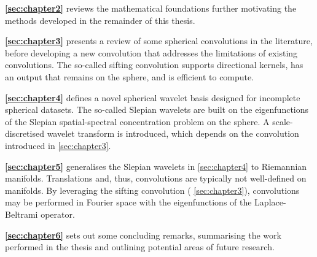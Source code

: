\begin{hangparas}{24pt}{1}
    \textbf{\cref{sec:chapter2}} reviews the mathematical foundations further motivating the methods developed in the remainder of this thesis.

    \textbf{\cref{sec:chapter3}} presents a review of some spherical convolutions in the literature, before developing a new convolution that addresses the limitations of existing convolutions.
    The so-called sifting convolution supports directional kernels, has an output that remains on the sphere, and is efficient to compute.

    \textbf{\cref{sec:chapter4}} defines a novel spherical wavelet basis designed for incomplete spherical datasets.
    The so-called Slepian wavelets are built on the eigenfunctions of the Slepian spatial-spectral concentration problem on the sphere.
    A scale-discretised wavelet transform is introduced, which depends on the convolution introduced in \cref{sec:chapter3}.

    \textbf{\cref{sec:chapter5}} generalises the Slepian wavelets in \cref{sec:chapter4} to Riemannian manifolds.
    Translations and, thus, convolutions are typically not well-defined on manifolds.
    By leveraging the sifting convolution (\cf{} \cref{sec:chapter3}), convolutions may be performed in Fourier space with the eigenfunctions of the Laplace-Beltrami operator.

    \textbf{\cref{sec:chapter6}} sets out some concluding remarks, summarising the work performed in the thesis and outlining potential areas of future research.
\end{hangparas}
